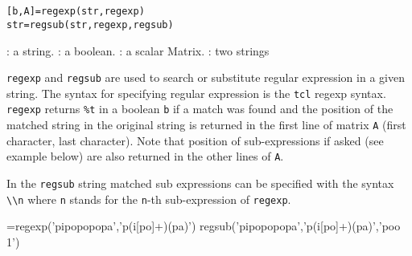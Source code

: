 
\begin{mandesc}
   \\
   \\
\end{mandesc}
\begin{calling_sequence}
\begin{verbatim}
[b,A]=regexp(str,regexp)
str=regsub(str,regexp,regsub)
\end{verbatim}
\end{calling_sequence}

\begin{parameters}
  \begin{varlist}
     : a string.
    :  a boolean.
    :  a scalar Matrix.
    : two strings
  \end{varlist}
\end{parameters}

\begin{mandescription}
\noindent \verb+regexp+ and \verb+regsub+ are used to search or substitute regular expression
in a given string. The syntax for specifying regular expression is the \verb+tcl+ 
regexp syntax. 
\verb+regexp+ returns \verb+%t+ in a boolean \verb+b+ if a match was found and the 
position of the matched string in the original string is returned in 
the first line of matrix \verb+A+ (first character, last character). 
Note that position of sub-expressions if asked (see example below) 
are also returned in the other lines of \verb+A+. 

In the \verb+regsub+ string matched sub expressions can be specified with the 
syntax \verb+\\n+ where \verb+n+ stands for the \verb+n+-th sub-expression of 
\verb+regexp+.
\end{mandescription}

\begin{examples}
  \begin{program}
    [a,b]=regexp('pipopopopa','p(i[po]+)(pa)')
    regsub('pipopopopa','p(i[po]+)(pa)','poo\\1')
  \end{program}
\end{examples}



